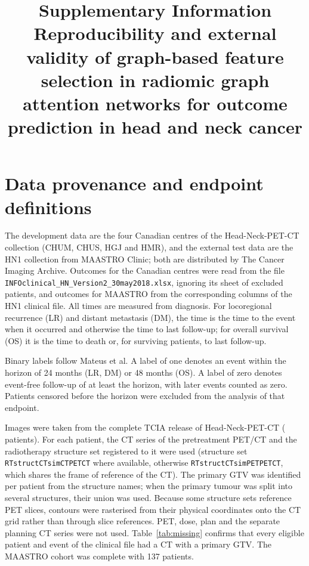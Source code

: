 \documentclass[11pt]{article}
\title{\textbf{Supplementary Information}\\[6pt]
\large Reproducibility and external validity of graph-based feature selection in radiomic graph attention networks for outcome prediction in head and neck cancer}
\author{}
\date{}
\begin{document}
\maketitle
\tableofcontents
\bigskip

\section{Data provenance and endpoint definitions}

The development data are the four Canadian centres of the Head-Neck-PET-CT collection (CHUM, CHUS, HGJ and HMR), and the external test data are the HN1 collection from MAASTRO Clinic; both are distributed by The Cancer Imaging Archive. Outcomes for the Canadian centres were read from the file \texttt{INFOclinical\_HN\_Version2\_30may2018.xlsx}, ignoring its sheet of excluded patients, and outcomes for MAASTRO from the corresponding columns of the HN1 clinical file. All times are measured from diagnosis. For locoregional recurrence (LR) and distant metastasis (DM), the time is the time to the event when it occurred and otherwise the time to last follow-up; for overall survival (OS) it is the time to death or, for surviving patients, to last follow-up.

Binary labels follow Mateus et al. A label of one denotes an event within the horizon of 24 months (LR, DM) or 48 months (OS). A label of zero denotes event-free follow-up of at least the horizon, with later events counted as zero. Patients censored before the horizon were excluded from the analysis of that endpoint.

Images were taken from the complete TCIA release of Head-Neck-PET-CT (\nHNPETclin{} patients). For each patient, the CT series of the pretreatment PET/CT and the radiotherapy structure set registered to it were used (structure set \texttt{RTstructCTsimCTPETCT} where available, otherwise \texttt{RTstructCTsimPETPETCT}, which shares the frame of reference of the CT). The primary GTV was identified per patient from the structure names; when the primary tumour was split into several structures, their union was used. Because some structure sets reference PET slices, contours were rasterised from their physical coordinates onto the CT grid rather than through slice references. PET, dose, plan and the separate planning CT series were not used. Table~\ref{tab:missing} confirms that every eligible patient and event of the clinical file had a CT with a primary GTV. The MAASTRO cohort was complete with 137 patients.
\end{document}

